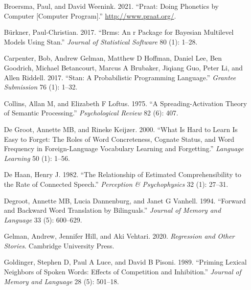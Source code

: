 \documentclass[
  man]{apa6}
\newlength{\cslhangindent}
\newenvironment{CSLReferences}[2] %
 {%
  \setlength{\parindent}{0pt}
  \ifodd #1 \everypar{\setlength{\hangindent}{\cslhangindent}}\ignorespaces\fi
  \ifnum #2 > 0
  \setlength{\parskip}{#2\baselineskip}
  \fi
 }%
 {}
\begin{document}
\hypertarget{refs}{}
\begin{CSLReferences}{1}{0}
\leavevmode{}%
Broersma, Paul, and David Weenink. 2021. {``Praat: Doing Phonetics by
Computer {[}Computer Program{]}.''} \url{http://www.praat.org/}.

\leavevmode{}%
Bürkner, Paul-Christian. 2017. {``Brms: An r Package for Bayesian
Multilevel Models Using Stan.''} \emph{Journal of Statistical Software}
80 (1): 1--28.

\leavevmode{}%
Carpenter, Bob, Andrew Gelman, Matthew D Hoffman, Daniel Lee, Ben
Goodrich, Michael Betancourt, Marcus A Brubaker, Jiqiang Guo, Peter Li,
and Allen Riddell. 2017. {``Stan: A Probabilistic Programming
Language.''} \emph{Grantee Submission} 76 (1): 1--32.

\leavevmode{}%
Collins, Allan M, and Elizabeth F Loftus. 1975. {``A
Spreading-Activation Theory of Semantic Processing.''}
\emph{Psychological Review} 82 (6): 407.

\leavevmode{}%
De Groot, Annette MB, and Rineke Keijzer. 2000. {``What Is Hard to Learn
Is Easy to Forget: The Roles of Word Concreteness, Cognate Status, and
Word Frequency in Foreign-Language Vocabulary Learning and
Forgetting.''} \emph{Language Learning} 50 (1): 1--56.

\leavevmode{}%
De Haan, Henry J. 1982. {``The Relationship of Estimated
Comprehensibility to the Rate of Connected Speech.''} \emph{Perception
\& Psychophysics} 32 (1): 27--31.

\leavevmode{}%
Degroot, Annette MB, Lucia Dannenburg, and Janet G Vanhell. 1994.
{``Forward and Backward Word Translation by Bilinguals.''} \emph{Journal
of Memory and Language} 33 (5): 600--629.

\leavevmode{}%
Gelman, Andrew, Jennifer Hill, and Aki Vehtari. 2020. \emph{Regression
and Other Stories}. Cambridge University Press.

\leavevmode{}%
Goldinger, Stephen D, Paul A Luce, and David B Pisoni. 1989. {``Priming
Lexical Neighbors of Spoken Words: Effects of Competition and
Inhibition.''} \emph{Journal of Memory and Language} 28 (5): 501--18.


\end{CSLReferences}
\end{document}
